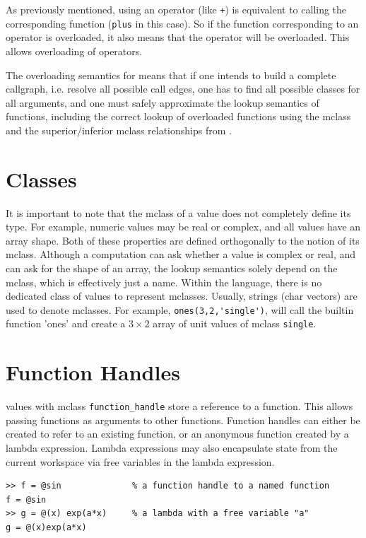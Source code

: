 As previously mentioned, using an operator (like \lstinline{+}) is equivalent
to calling the corresponding function (\lstinline{plus} in this case).
So if the function corresponding to an operator is overloaded, it also means
that the operator will be overloaded. This allows overloading of \matlab operators.

The overloading semantics for \matlab means that if one intends
to build a complete callgraph, i.e. resolve all possible call edges,
one has to find all possible \matlab classes for all arguments, and one must
safely approximate the lookup semantics of functions, including the correct
lookup of overloaded functions using the mclass and the superior/inferior
mclass relationships from .

\section{\matlab Classes }

It is important to note that the mclass of a value does not completely
define its type.  For example, numeric \matlab values may be real or
complex, and all values have an array shape.  Both of these properties are
defined orthogonally to the notion of its mclass. Although a computation can
ask whether a value is complex or real,  and can ask for the shape of
an array,  the lookup semantics solely depend on the mclass, which
is effectively just a name.   Within the \matlab language, there is no
dedicated class of values to represent mclasses. Usually, strings
(char vectors) are used to denote mclasses. For example,
\lstinline{ones(3,2,'single')}, will call the builtin function 'ones'
and create a $3 \times 2$ array of unit values of mclass \texttt{single}.

\section{Function Handles}
\label{sec:lambda}

\matlab values with mclass {\tt function\_handle} store a reference to a
function. This allows passing functions as arguments to other
functions. Function handles can either be created to
refer to an existing function, or an anonymous function created by a lambda expression.
Lambda expressions may also encapsulate state from the
current workspace via free variables in the lambda expression.

\begin{lstlisting}
>> f = @sin              % a function handle to a named function
f = @sin
>> g = @(x) exp(a*x)     % a lambda with a free variable "a"
g = @(x)exp(a*x)
\end{lstlisting}

